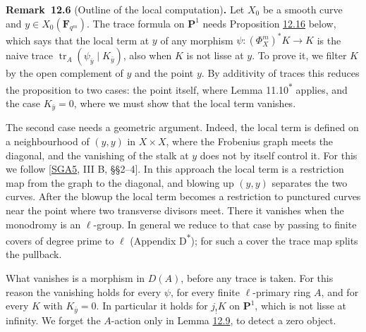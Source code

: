 \documentclass[11pt]{article}
\newenvironment{bpstatement}[2]{\par\addvspace{0.6\baselineskip}\noindent\textbf{#1}#2\textbf{.}\enspace\ignorespaces}
  {\par\addvspace{0.4\baselineskip}}
\newcommand{\bpout}[1]{#1\textsuperscript{\hyperlink{bp-outside}{\ensuremath{\ast}}}}
\begin{document}
\label{bp18}%
\begin{bpstatement}{Remark~12.6}{ (Outline of the local computation)}
Let \(X_0\) be a smooth curve and \(y\in X_0(\mathbf F_{q^m})\). The trace formula on \(\mathbf P^1\) needs Proposition \hyperref[bp49]{12.16} below, which says that the local term at \(y\) of any morphism \(\psi:(\Phi_X^m)^*K\to K\) is the naive trace \(\operatorname{tr}_A(\psi_{\bar y}\mid K_{\bar y})\), also when \(K\) is not lisse at \(y\). To prove it, we filter \(K\) by the open complement of \(y\) and the point \(y\). By additivity of traces this reduces the proposition to two cases: the point itself, where Lemma \bpout{11.10} applies, and the case \(K_{\bar y}=0\), where we must show that the local term vanishes.

The second case needs a geometric argument. Indeed, the local term is defined on a neighbourhood of \((y,y)\) in \(X\times X\), where the Frobenius graph meets the diagonal, and the vanishing of the stalk at \(y\) does not by itself control it. For this we follow [\hyperref[bp105]{SGA5}, III B, §§2–4]. In this approach the local term is a restriction map from the graph to the diagonal, and blowing up \((y,y)\) separates the two curves. After the blowup the local term becomes a restriction to punctured curves near the point where two transverse divisors meet. There it vanishes when the monodromy is an \(\ell\)-group. In general we reduce to that case by passing to finite covers of degree prime to \(\ell\) (Appendix \bpout{D}); for such a cover the trace map splits the pullback.

What vanishes is a morphism in \(D(A)\), before any trace is taken. For this reason the vanishing holds for every \(\psi\), for every finite \(\ell\)-primary ring \(A\), and for every \(K\) with \(K_{\bar y}=0\). In particular it holds for \(j_!K\) on \(\mathbf P^1\), which is not lisse at infinity. We forget the \(A\)-action only in Lemma \hyperref[bp28]{12.9}, to detect a zero object.
\end{bpstatement}

\end{document}
